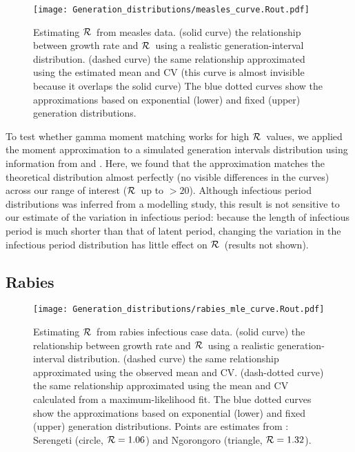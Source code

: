 \documentclass[12pt]{article}
\newcommand{\RR}{\ensuremath{{\cal R}}}
\begin{document}
{\begin{figure}[htbp] \centering
	\texttt{[image: Generation\_distributions/measles\_curve.Rout.pdf]}
	\caption{Estimating \RR~from measles data.
		(solid curve) the relationship between growth rate and \RR~using a realistic generation-interval distribution.
		(dashed curve) the same relationship approximated using the estimated mean and CV (this curve is almost invisible because it overlaps the solid curve)
		The blue dotted curves show the approximations based on exponential (lower) and fixed (upper) generation distributions.
	}
	\label{fig:measlesCurve}
\end{figure}

To test whether gamma moment matching works for high \RR\ values, we applied the moment approximation to a simulated generation intervals distribution using information from \cite{LessReic09} and \cite{Lloy01}. 
Here, we found that the approximation matches the theoretical distribution almost perfectly (no visible differences in the curves) across our range of interest (\RR\ up to $>20$).
Although infectious period distributions was inferred from a modelling study, this result is not sensitive to our estimate of the variation in infectious period: because the length of infectious period is much shorter than that of latent period, changing the variation in the infectious period distribution has little effect on \RR\ (results not shown). 

\subsection{Rabies}

\begin{figure}[htbp] \centering
	\texttt{[image: Generation\_distributions/rabies\_mle\_curve.Rout.pdf]}
	\caption{Estimating \RR~from rabies infectious case data.
		(solid curve) the relationship between growth rate and \RR~using a realistic generation-interval distribution.
		(dashed curve) the same relationship approximated using the observed mean and CV.
		(dash-dotted curve) the same relationship approximated using the mean and CV calculated from a maximum-likelihood fit.
		The blue dotted curves show the approximations based on exponential (lower) and fixed (upper) generation distributions.
		Points are estimates from \cite{HampDush09}:
		Serengeti (circle, $\RR=1.06$) and Ngorongoro (triangle, $\RR=1.32$).
	}
	\label{fig:rabiesCurve}
\end{figure}

}
\end{document}
